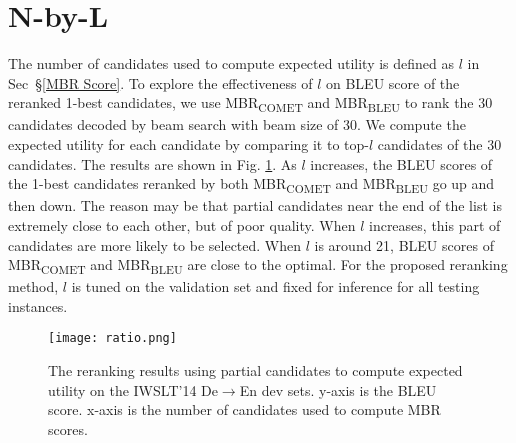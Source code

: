 \documentclass{article}
\begin{document}



\appendix





\section{N-by-L} 
\label{partial candidates}
The number of candidates used to compute expected utility is defined as $l$ in Sec~\S\ref{MBR Score}. To explore the effectiveness of $l$ on BLEU score of the reranked 1-best candidates, we use MBR\textsubscript{COMET} and MBR\textsubscript{BLEU} to rank the 30 candidates decoded by beam search with beam size of 30. We compute the expected utility for each candidate by comparing it to top-$l$ candidates of the 30 candidates. The results are shown in Fig. \ref{f3}. As $l$ increases, the BLEU scores of the 1-best candidates reranked by both MBR\textsubscript{COMET} and MBR\textsubscript{BLEU} go up and then down. The reason may be that partial candidates near the end of the list is extremely close to each other, but of poor quality. When $l$ increases, this part of candidates are more likely to be selected. When $l$ is around 21, BLEU scores of MBR\textsubscript{COMET} and MBR\textsubscript{BLEU} are close to the optimal. For the proposed reranking method, $l$ is tuned on the validation set and fixed for inference for all testing instances.

\begin{figure}[!htbp]
	\centering 
    \texttt{[image: ratio.png]}
	\caption{The reranking results using partial candidates to compute expected utility on the IWSLT’14 De$\to$En dev sets. y-axis is the BLEU score. x-axis is the number of candidates used to compute MBR scores.}
	\label{f3}
\end{figure}
\end{document}
